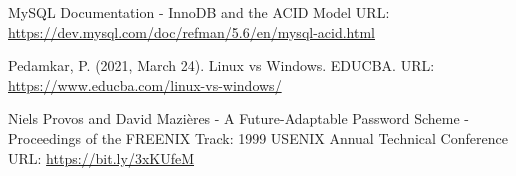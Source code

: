 \begin{thebibliography}{00}
 MySQL Documentation - InnoDB and the ACID Model
\newline
URL: \url{https://dev.mysql.com/doc/refman/5.6/en/mysql-acid.html}

 Pedamkar, P. (2021, March 24). Linux vs Windows. EDUCBA.
\newline
URL: \url{https://www.educba.com/linux-vs-windows/}

 Niels Provos and David Mazières - A Future-Adaptable Password Scheme - Proceedings of the FREENIX Track: 1999 USENIX Annual Technical Conference
\newline
URL: \url{https://bit.ly/3xKUfeM}

\end{thebibliography}